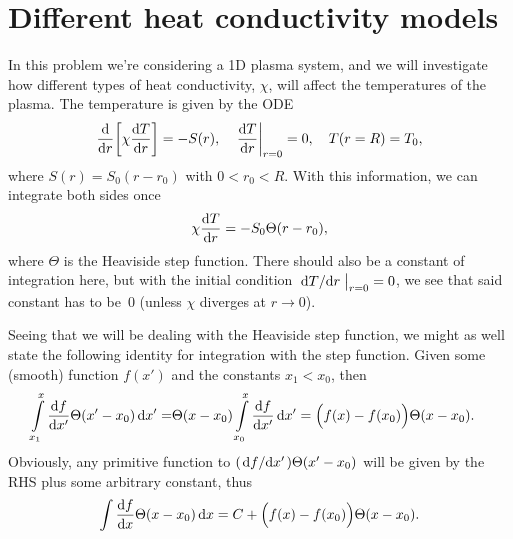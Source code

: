 \documentclass[11pt,a4paper, 
swedish, english %
]{article}
\begin{document}
\section{Different heat conductivity models}
In this problem we're considering a 1D plasma system, and we will
investigate how different types of heat conductivity, $\chi$, will
affect the temperatures of the plasma. The temperature is given by the
ODE
\begin{equation}
\dv{r}\qty[\chi\dv{T}{r}]=-S(r)\qc
\eval{\dv{T}{r}}_{r=0}=0\qc
T(r=R)=T_0,
\end{equation}
where $S(r)=S_0(r-r_0)$ with $0<r_0<R$. With this information, we can
integrate both sides once
\begin{equation}\label{eq2:ODE}
\chi\dv{T}{r}=-S_0\Theta(r-r_0),
\end{equation}
where $\Theta$ is the Heaviside step function. There should also be a
constant of integration here, but with the initial condition
$\eval{\dv*{T}{r}}_{r=0}=0$, we see that said constant has to be~0
(unless $\chi$ diverges at $r\to0$).

Seeing that we will be dealing with the Heaviside step function, we
might as well state the following identity for integration with the
step function. Given some (smooth) function $f(x')$ and the constants
$x_1<x_0$, then 
\begin{equation}
\begin{aligned}
\int_{x_1}^{x}\dv{f}{x'}\Theta(x'-x_0)\id{x'}=&
\Theta(x-x_0)\int_{x_0}^{x}\dv{f}{x'}\id{x'}
=\Big(f(x)-f(x_0)\Big)\Theta(x-x_0).
\end{aligned}
\end{equation}
Obviously, any primitive function to $(\dv*{f}{x'})\Theta(x'-x_0)$
will be given by the RHS plus some arbitrary constant, thus
\begin{equation}\label{eq2:heaviside-int}
\int\dv{f}{x}\Theta(x-x_0)\id{x}
=C+\Big(f(x)-f(x_0)\Big)\Theta(x-x_0).
\end{equation}
\end{document}
